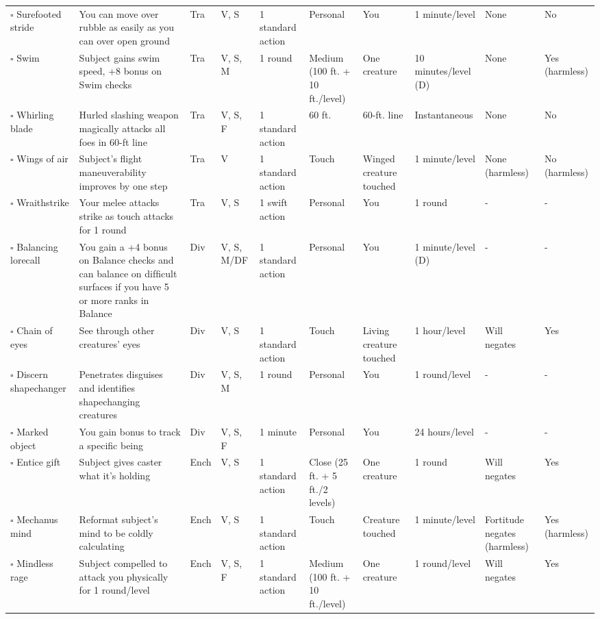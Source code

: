 \documentclass[12pt, a4paper]{article}
\begin{document}
\begin{center}
\begin{longtable}[H]{ p{8em} p{15em} p{2em} p{5em} p{6em} p{6em} p{10em} p{6em} p{5em} p{2em} }
    \(\square\) Surefooted stride & You can move over rubble as easily as you can over open ground & Tra & V, S & 1 standard action & Personal & You & 1 minute/level & None & No\\
    \(\square\) Swim & Subject gains swim speed, +8 bonus on Swim checks & Tra & V, S, M & 1 round & Medium (100 ft. + 10 ft./level) & One creature & 10 minutes/level (D) & None & Yes (harmless)\\
    \(\square\) Whirling blade & Hurled slashing weapon magically attacks all foes in 60-ft line & Tra & V, S, F & 1 standard action & 60 ft. & 60-ft. line & Instantaneous & None & No\\
    \(\square\) Wings of air & Subject’s ﬂight maneuverability improves by one step & Tra & V & 1 standard action & Touch & Winged creature touched & 1 minute/level & None (harmless) & No (harmless)\\
    \(\square\) Wraithstrike & Your melee attacks strike as touch attacks for 1 round & Tra & V, S & 1 swift action & Personal & You & 1 round & - & -\\
    \(\square\) Balancing lorecall & You gain a +4 bonus on Balance checks and can balance on difﬁcult surfaces if you have 5 or more ranks in Balance & Div & V, S, M/DF & 1 standard action & Personal & You & 1 minute/level (D) & - & -\\
    \(\square\) Chain of eyes & See through other creatures’ eyes & Div & V, S & 1 standard action & Touch & Living creature touched & 1 hour/level & Will negates & Yes\\
    \(\square\) Discern shapechanger & Penetrates disguises and identiﬁes shapechanging creatures & Div & V, S, M & 1 round & Personal & You & 1 round/level & - & -\\
    \(\square\) Marked object & You gain bonus to track a speciﬁc being & Div & V, S, F & 1 minute & Personal & You & 24 hours/level & - & -\\
    \(\square\) Entice gift & Subject gives caster what it’s holding & Ench & V, S & 1 standard action & Close (25 ft. + 5 ft./2 levels) & One creature & 1 round & Will negates & Yes\\
    \(\square\) Mechanus mind & Reformat subject’s mind to be coldly calculating & Ench & V, S & 1 standard action & Touch & Creature touched & 1 minute/level & Fortitude negates (harmless) & Yes (harmless)\\
    \(\square\) Mindless rage & Subject compelled to attack you physically for 1 round/level & Ench & V, S, F & 1 standard action & Medium (100 ft. + 10 ft./level) & One creature & 1 round/level & Will negates & Yes\\

\end{longtable}
\end{center}
\end{document}
